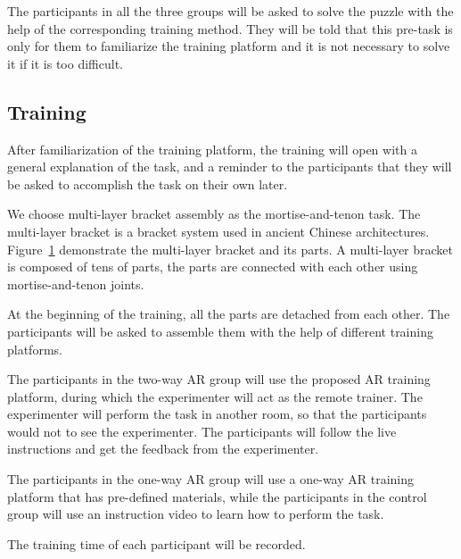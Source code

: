 The participants in all the three groups will be asked to solve the puzzle with the help of the corresponding training method. They will be told that this pre-task is only for them to familiarize the training platform and it is not necessary to solve it if it is too difficult.

\subsection{Training}

After familiarization of the training platform, the training will open with a general explanation of the task, and a reminder to the participants that they will be asked to accomplish the task on their own later.

We choose multi-layer bracket assembly as the mortise-and-tenon task.
The multi-layer bracket is a bracket system used in ancient Chinese architectures.
Figure~\ref{fig:mat-task} demonstrate the multi-layer bracket and its parts. A multi-layer bracket is composed of tens of parts, the parts are connected with each other using mortise-and-tenon joints.

At the beginning of the training, all the parts are detached from each other. The participants will be asked to assemble them with the help of different training platforms.

The participants in the two-way AR group will use the proposed AR training platform, during which the experimenter will act as the remote trainer. The experimenter will perform the task in another room, so that the participants would not to see the experimenter. The participants will follow the live instructions and get the feedback from the experimenter.

The participants in the one-way AR group will use a one-way AR training platform that has pre-defined materials, while the participants in the control group will use an instruction video to learn how to perform the task.

The training time of each participant will be recorded.

\begin{figure}
	\centering
	\centering
	\label{fig:mat-task}
\end{figure}

